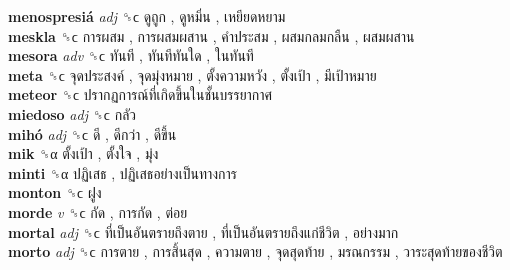 \textbf{menospresiá} \emph{adj}  ␝ϲ   ดูถูก ,  ดูหมิ่น ,  เหยียดหยาม   \\
\textbf{meskla} ␝ϲ   การผสม ,  การผสมผสาน ,  คำประสม ,  ผสมกลมกลืน ,  ผสมผสาน   \\
\textbf{mesora} \emph{adv}  ␝ϲ   ทันที ,  ทันทีทันใด ,  ในทันที   \\
\textbf{meta} ␝ϲ   จุดประสงค์ ,  จุดมุ่งหมาย ,  ตั้งความหวัง ,  ตั้งเป้า ,  มีเป้าหมาย   \\
\textbf{meteor} ␝ϲ   ปรากฏการณ์ที่เกิดขึ้นในชั้นบรรยากาศ   \\
\textbf{miedoso} \emph{adj}  ␝ϲ   กลัว   \\
\textbf{mihó} \emph{adj}  ␝ϲ   ดี ,  ดีกว่า ,  ดีขึ้น   \\
\textbf{mik} ␝α   ตั้งเป้า ,  ตั้งใจ ,  มุ่ง   \\
\textbf{minti} ␝α   ปฏิเสธ ,  ปฏิเสธอย่างเป็นทางการ   \\
\textbf{monton} ␝ϲ   ฝูง   \\
\textbf{morde} \emph{v}  ␝ϲ   กัด ,  การกัด ,  ต่อย   \\
\textbf{mortal} \emph{adj}  ␝ϲ   ที่เป็นอันตรายถึงตาย ,  ที่เป็นอันตรายถึงแก่ชีวิต ,  อย่างมาก   \\
\textbf{morto} \emph{adj}  ␝ϲ   การตาย ,  การสิ้นสุด ,  ความตาย ,  จุดสุดท้าย ,  มรณกรรม ,  วาระสุดท้ายของชีวิต   \\
